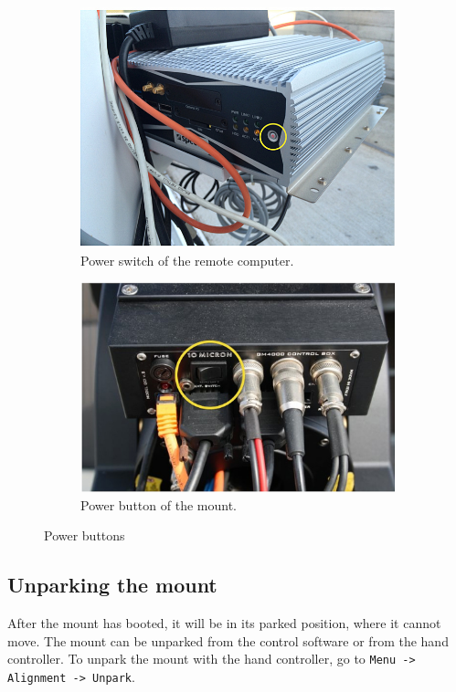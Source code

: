 \documentclass[a4paper, 11pt, fleqn]{memoir}
\begin{document}
\begin{figure}
    \centering
    \begin{subfigure}[b]{0.47\textwidth}
        \includegraphics[width=\textwidth]{remotePC-switch}
        \caption{Power switch of the remote computer.}
        \label{fig:telescope-pc-power-switch}
    \end{subfigure}
    \begin{subfigure}[b]{0.47\textwidth}
        \includegraphics[width=\textwidth]{gm4000-control-box}
        \caption{Power button of the mount.}
        \label{fig:mount-power-switch}
    \end{subfigure}
    \caption{Power buttons}
\end{figure}

\subsection{Unparking the mount}
After the mount has booted, it will be in its parked position, where it cannot move.
The mount can be unparked from the control software or from the hand controller.
To unpark the mount with the hand controller, go to \texttt{Menu -> Alignment -> Unpark}.
\end{document}
